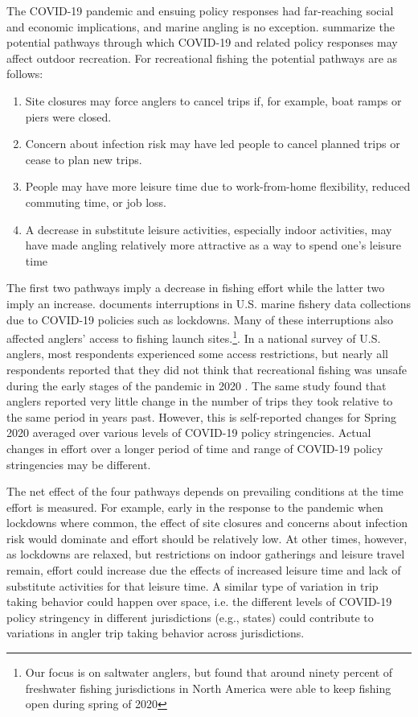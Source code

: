 \documentclass[12pt]{article}
\begin{document}
The COVID-19 pandemic and ensuing policy responses had far-reaching social and economic implications, and marine angling is no exception. \citet{landry2021has} summarize the potential pathways through which COVID-19 and related policy responses may affect outdoor recreation. For recreational fishing the potential pathways are as follows:

\begin{enumerate}
\def\labelenumi{\arabic{enumi}.}
\item
  Site closures may force anglers to cancel trips if, for example, boat
  ramps or piers were closed.
\item
  Concern about infection risk may have led people to cancel planned
  trips or cease to plan new trips.
\item
  People may have more leisure time due to work-from-home flexibility,
  reduced commuting time, or job loss.
\item
  A decrease in substitute leisure activities, especially indoor
  activities, may have made angling relatively more attractive as a way
  to spend one's leisure time \citep{midway2021covid,morales2021contrasting}
\end{enumerate}

The first two pathways imply a decrease in fishing effort while the latter two imply an increase. \citet{link2021noaa} documents interruptions in U.S. marine fishery data collections due to COVID-19 policies such as lockdowns. Many of these interruptions also affected anglers' access to fishing launch sites.\footnote{Our focus is on saltwater anglers, but \citet{paradis2021can} found that around ninety percent of freshwater fishing jurisdictions in North America were able to keep fishing open during spring of 2020}. In a national survey of U.S. anglers, most respondents experienced some access restrictions, but nearly all respondents reported that they did not think that recreational fishing was unsafe during the early stages of the pandemic in 2020 \citep{midway2021covid}. The same study found that anglers reported very little change in the number of trips they took relative to the same period in years past. However, this is self-reported changes for Spring 2020 averaged over various levels of COVID-19 policy stringencies.  Actual changes in effort over a longer period of time and range of COVID-19 policy stringencies may be different. 

The net effect of the four pathways depends on prevailing conditions at the time effort is measured. For example, early in the response to the pandemic when lockdowns where common, the effect of site closures and concerns about infection risk would dominate and effort should be relatively low. At other times, however, as lockdowns are relaxed, but restrictions on indoor gatherings and leisure travel remain, effort could increase due the effects of increased leisure time and lack of substitute activities for that leisure time. A similar type of variation in trip taking behavior could happen over space, i.e. the different levels of COVID-19 policy stringency in different jurisdictions (e.g., states) could contribute to variations in angler trip taking behavior across jurisdictions.
\end{document}
